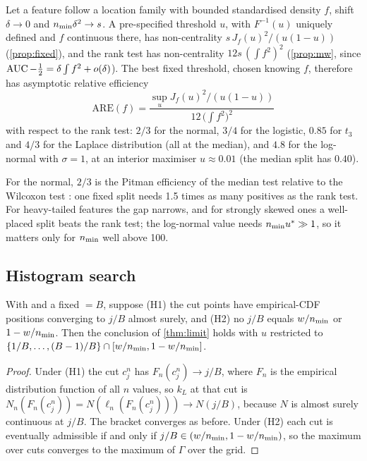 \begin{corollary}\label{cor:efficiency}
Let a feature follow a location family with bounded standardised density $f$, shift $\delta \to 0$ and $n_{\min}\delta^2 \to s$. A pre-specified threshold $u$, with $F^{-1}(u)$ uniquely defined and $f$ continuous there, has non-centrality $s\,J_f(u)^2/(u(1-u))$ (\cref{prop:fixed}), and the rank test has non-centrality $12 s\,(\int f^2)^2$ (\cref{prop:mw}, since $\operatorname{AUC} - \tfrac12 = \delta\int f^2 + o(\delta)$). The best fixed threshold, chosen knowing $f$, therefore has asymptotic relative efficiency
\begin{equation}\label{eq:efficiency}
  \mathrm{ARE}(f) = \frac{\sup_u J_f(u)^2/(u(1-u))}{12\,\bigl(\int f^2\bigr)^2}
\end{equation}
with respect to the rank test: $2/3$ for the normal, $3/4$ for the logistic, $0.85$ for $t_3$ and $4/3$ for the Laplace distribution (all at the median), and $4.8$ for the log-normal with $\sigma = 1$, at an interior maximiser $u \approx 0.01$ (the median split has $0.40$).
\end{corollary}

For the normal, $2/3$ is the Pitman efficiency of the median test relative to the Wilcoxon test \citep{mood1954asymptotic,hodges1956efficiency}: one fixed split needs 1.5 times as many positives as the rank test. For heavy-tailed features the gap narrows, and for strongly skewed ones a well-placed split beats the rank test; the log-normal value needs $n_{\min} u^* \gg 1$, so it matters only for $n_{\min}$ well above 100.

\subsection{Histogram search}\label{app:hist}

\begin{corollary}\label{cor:hist}
With  and a fixed  $= B$, suppose (H1) the cut points have empirical-CDF positions converging to $j/B$ almost surely, and (H2) no $j/B$ equals $w/n_{\min}$ or $1-w/n_{\min}$. Then the conclusion of \cref{thm:limit} holds with $u$ restricted to $\{1/B,\dots,(B-1)/B\}\cap[w/n_{\min}, 1-w/n_{\min}]$.
\end{corollary}

\begin{proof}
Under (H1) the cut $c^n_j$ has $F_n(c^n_j)\to j/B$, where $F_n$ is the empirical distribution function of all $n$ values, so $k_L$ at that cut is $N_n(F_n(c^n_j)) = N(\ell_n(F_n(c^n_j)))\to N(j/B)$, because $N$ is almost surely continuous at $j/B$. The bracket converges as before. Under (H2) each cut is eventually admissible if and only if $j/B\in(w/n_{\min}, 1-w/n_{\min})$, so the maximum over cuts converges to the maximum of $\Gamma$ over the grid.
\end{proof}

